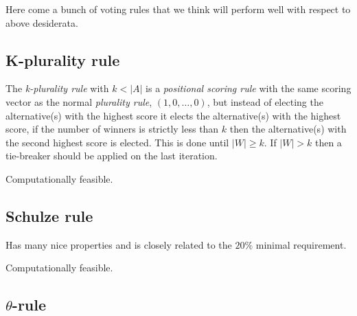 \documentclass{article}
\begin{document}
Here come a bunch of voting rules that we think will perform well with respect to above desiderata.





\subsection{K-plurality rule}

The {\em k-plurality rule} with $k<|A|$ is a {\em positional scoring rule} with the same scoring vector as the normal
{\em plurality rule}, $(1,0, \dots, 0)$, but instead of electing the alternative(s) with the highest score it elects the
alternative(s) with the highest score, if the number of winners is strictly less than $k$ then the alternative(s) with
the second highest score is elected. This is done until $|W| \geq k$. If $|W| > k$ then a tie-breaker should be applied
on the last iteration.


Computationally feasible.\subsection{Schulze rule}

Has many nice properties and is closely related to the $20\%$ minimal requirement.

Computationally feasible.

\subsection{$\theta$-rule}
\end{document}
